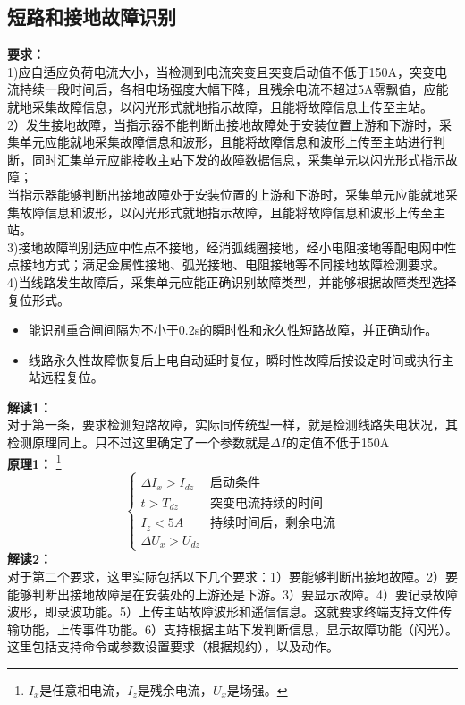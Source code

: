 \documentclass{article}
\begin{document}
\begin{CJK}{UTF8}{gbsn}
\subsection{ 短路和接地故障识别}
	\par
	\textbf{要求：}\\
	1)应自适应负荷电流大小，当检测到电流突变且突变启动值不低于150A，突变电流持续一段时间后，各相电场强度大幅下降，且残余电流不超过5A零飘值，应能就地采集故障信息，以闪光形式就地指示故障，且能将故障信息上传至主站。\\
	2）发生接地故障，当指示器不能判断出接地故障处于安装位置上游和下游时，采集单元应能就地采集故障信息和波形，且能将故障信息和波形上传至主站进行判断，同时汇集单元应能接收主站下发的故障数据信息，采集单元以闪光形式指示故障；\\
	当指示器能够判断出接地故障处于安装位置的上游和下游时，采集单元应能就地采集故障信息和波形，以闪光形式就地指示故障，且能将故障信息和波形上传至主站。\\
	3)接地故障判别适应中性点不接地，经消弧线圈接地，经小电阻接地等配电网中性点接地方式；满足金属性接地、弧光接地、电阻接地等不同接地故障检测要求。\\
	4)当线路发生故障后，采集单元应能正确识别故障类型，并能够根据故障类型选择复位形式。
	\begin{itemize}
			\item 能识别重合闸间隔为不小于0.2s的瞬时性和永久性短路故障，并正确动作。
			\item 线路永久性故障恢复后上电自动延时复位，瞬时性故障后按设定时间或执行主站远程复位。
	\end{itemize}
	\textbf{解读1：}\\
	对于第一条，要求检测短路故障，实际同传统型一样，就是检测线路失电状况，其检测原理同上。只不过这里确定了一个参数就是$\Delta I$的定值不低于150A\\
	\textbf{原理1：}
	\footnote{$I_x$是任意相电流，$I_z$是残余电流，$U_x$是场强。}
	$$	
		\left\{ \begin{array}{ll}
				\Delta I_x>I_{dz} & \textrm{启动条件}\\
			    t>T_{dz} & \textrm{突变电流持续的时间}\\
				I_z<5A & \textrm{持续时间后，剩余电流}\\ 
			\Delta U_x>U_{dz}
		\end{array}
		\right.
	$$
	\textbf{解读2：}\\
	对于第二个要求，这里实际包括以下几个要求：1）要能够判断出接地故障。2）要能够判断出接地故障是在安装处的上游还是下游。3）要显示故障。4）要记录故障波形，即录波功能。5）上传主站故障波形和遥信信息。这就要求终端支持文件传输功能，上传事件功能。6）支持根据主站下发判断信息，显示故障功能（闪光）。这里包括支持命令或参数设置要求（根据规约），以及动作。\\

\end{CJK}
\end{document}
